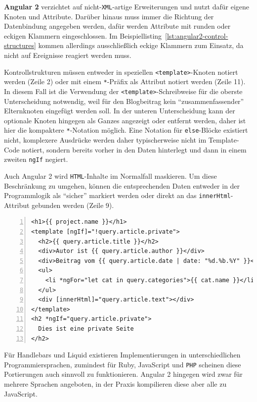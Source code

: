\textbf{Angular 2} verzichtet auf nicht-\texttt{XML}-artige Erweiterungen und nutzt dafür eigene Knoten und Attribute. Darüber hinaus muss immer die Richtung der Datenbindung angegeben werden, dafür werden Attribute mit runden oder eckigen Klammern eingeschlossen. Im Beispiellisting~\ref{lst:angular2-control-structures} kommen allerdings ausschließlich eckige Klammern zum Einsatz, da nicht auf Ereignisse reagiert werden muss.

Kontrollstrukturen müssen entweder in speziellen \texttt{<template>}-Knoten notiert werden (Zeile 2) oder mit einem \texttt{*}-Präfix als Attribut notiert werden (Zeile 11). In diesem Fall ist die Verwendung der \texttt{<template>}-Schreibweise für die oberste Unterscheidung notwendig, weil für den Blogbeitrag kein "`zusammenfassender"' Elternknoten eingefügt werden soll. In der unteren Unterscheidung kann der optionale Knoten hingegen als Ganzes angezeigt oder entfernt werden, daher ist hier die kompaktere \texttt{*}-Notation möglich. Eine Notation für \texttt{else}-Blöcke existiert nicht, komplexere Ausdrücke werden daher typischerweise nicht im Template-Code notiert, sondern bereits vorher in den Daten hinterlegt und dann in einem zweiten \texttt{ngIf} negiert.

Auch Angular 2 wird \texttt{HTML}-Inhalte im Normalfall maskieren. Um diese Beschränkung zu umgehen, können die entsprechenden Daten entweder in der Programmlogik als "`sicher"' markiert werden oder direkt an das \texttt{innerHtml}-Attribut gebunden werden (Zeile 9).

\begin{lstlisting}[float=h, numbers=left, caption={Blogartikel mit Angular 2}, label={lst:angular2-control-structures}]
<h1>{{ project.name }}</h1>
<template [ngIf]="!query.article.private">
  <h2>{{ query.article.title }}</h2>
  <div>Autor ist {{ query.article.author }}</div>
  <div>Beitrag vom {{ query.article.date | date: "%d.%b.%Y" }}</div>
  <ul>
    <li *ngFor="let cat in query.categories">{{ cat.name }}</li>
  </ul>
  <div [innerHtml]="query.article.text"></div>
</template>
<h2 *ngIf="query.article.private">
  Dies ist eine private Seite
</h2>
\end{lstlisting}

Für Handlebars und Liquid existieren Implementierungen in unterschiedlichen Programmiersprachen, zumindest für Ruby, JavaScript und \texttt{PHP} scheinen diese Portierungen auch sinnvoll zu funktionieren. Angular 2 hingegen wird zwar für mehrere Sprachen angeboten, in der Praxis kompilieren diese aber alle zu JavaScript.

